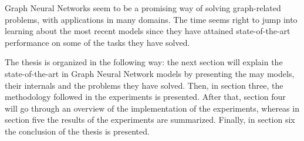 Graph Neural Networks seem to be a promising way of solving graph-related problems, with applications in many domains. The time seems right to jump into learning about the most recent models since they have attained state-of-the-art performance on some of the tasks they have solved.



The thesis is organized in the following way: the next section will explain the state-of-the-art in Graph Neural Network models by presenting the may models, their internals and the problems they have solved. Then, in section three, the methodology followed in the experiments is presented. After that, section four will go through an overview of the implementation of the experiments, whereas in section five the results of the experiments are summarized. Finally, in section six the conclusion of the thesis is presented.